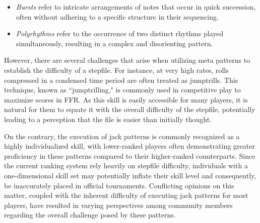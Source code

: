 \begin{figure}[H]
\end{figure}


\begin{itemize}
	\item \textit{Bursts} refer to intricate arrangements of notes that occur in quick succession, often without adhering to a specific structure in their sequencing.
	      
	\item \textit{Polyrhythms} refer to the occurrence of two distinct rhythms played simultaneously, resulting in a complex and disorienting pattern.
\end{itemize}

However, there are several challenges that arise when utilizing meta patterns to establish the difficulty of a stepfile. For instance, at very high rates, rolls compressed in a condensed time period are often treated as jumptrills. This technique, known as ``jumptrilling," is commonly used in competitive play to maximize scores in FFR. As this skill is easily accessible for many players, it is natural for them to equate it with the overall difficulty of the stepfile, potentially leading to a perception that the file is easier than initially thought.

\vspace{2mm}

On the contrary, the execution of jack patterns is commonly recognized as a highly individualized skill, with lower-ranked players often demonstrating greater proficiency in these patterns compared to their higher-ranked counterparts. Since the current ranking system rely heavily on stepfile difficulty, individuals with a one-dimensional skill set may potentially inflate their skill level and consequently, be inaccurately placed in official tournaments. Conflicting opinions on this matter, coupled with the inherent difficulty of executing jack patterns for most players, have resulted in varying perspectives among community members regarding the overall challenge posed by these patterns.

